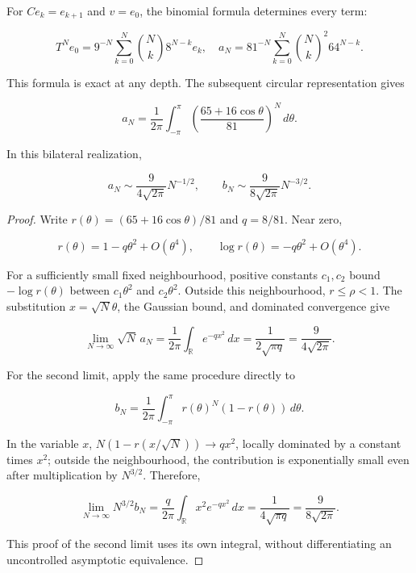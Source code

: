 For \(C e_k=e_{k+1}\) and \(v=e_0\), the binomial formula determines every term:

\begin{equation}
T^Ne_0=9^{-N}\sum_{k=0}^{N}\binom{N}{k}8^{N-k}e_k,
\quad
a_N=81^{-N}\sum_{k=0}^{N}\binom{N}{k}^{\!2}64^{N-k}.
\label{nuc03:eq:18}
\end{equation}

This formula is exact at any depth. The subsequent circular representation gives

\begin{equation}
a_N=\frac1{2\pi}\int_{-\pi}^{\pi}
\left(\frac{65+16\cos\theta}{81}\right)^N\,d\theta.
\label{nuc03:eq:19}
\end{equation}

\begin{theorem}
In this bilateral realization,

\begin{equation}
\boxed{a_N\sim\frac9{4\sqrt{2\pi}}N^{-1/2},\qquad
b_N\sim\frac9{8\sqrt{2\pi}}N^{-3/2}.}
\label{nuc03:eq:20}
\end{equation}
\end{theorem}

\begin{proof}
Write \(r(\theta)=(65+16\cos\theta)/81\) and \(q=8/81\). Near zero,

\[
r(\theta)=1-q\theta^2+O(\theta^4),\qquad
\log r(\theta)=-q\theta^2+O(\theta^4).
\]

For a sufficiently small fixed neighbourhood, positive constants \(c_1,c_2\) bound \(-\log r(\theta)\) between \(c_1\theta^2\) and \(c_2\theta^2\). Outside this neighbourhood, \(r\leq\rho<1\). The substitution \(x=\sqrt N\theta\), the Gaussian bound, and dominated convergence give

\[
\lim_{N\to\infty}\sqrt N\,a_N
=\frac1{2\pi}\int_{\mathbb R}e^{-qx^2}\,dx
=\frac1{2\sqrt{\pi q}}=\frac9{4\sqrt{2\pi}}.
\]

For the second limit, apply the same procedure directly to

\[
b_N=\frac1{2\pi}\int_{-\pi}^{\pi}r(\theta)^N(1-r(\theta))\,d\theta.
\]

In the variable \(x\), \(N(1-r(x/\sqrt N))\to qx^2\), locally dominated by a constant times \(x^2\); outside the neighbourhood, the contribution is exponentially small even after multiplication by \(N^{3/2}\). Therefore,

\[
\lim_{N\to\infty}N^{3/2}b_N
=\frac q{2\pi}\int_{\mathbb R}x^2e^{-qx^2}\,dx
=\frac1{4\sqrt{\pi q}}=\frac9{8\sqrt{2\pi}}.
\]

This proof of the second limit uses its own integral, without differentiating an uncontrolled asymptotic equivalence.
\end{proof}

